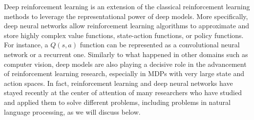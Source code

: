 Deep reinforcement learning is an extension of the classical reinforcement learning methods to leverage the representational power of deep models. More specifically, deep neural networks allow reinforcement learning algorithms to approximate and store highly complex value functions, state-action functions, or policy functions. For instance, a $Q(s,a)$ function can be represented as a convolutional neural network or a recurrent one. Similarly to what happened in other domains such as computer vision, deep models are also playing a decisive role in the advancement of reinforcement learning research, especially in MDPs with very large state and action spaces. In fact, reinforcement learning and deep neural networks have stayed recently at the center of attention of many researchers who have studied and applied them to solve different problems, including problems in natural language processing, as we will discuss below.

